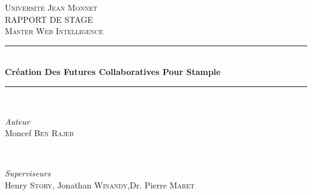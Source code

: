 \documentclass[pdftex,12pt,a4paper]{report}
\begin{document}
\begin{titlepage}

\newcommand{\HRule}{\rule{\linewidth}{0.9mm}} %
\vspace*{2cm}


\center %
 

\textsc{\LARGE Universite Jean Monnet}\\[1.5cm] %
\textsc{\Large RAPPORT DE STAGE}\\[0.5cm] %
\textsc{\large Master Web Intelligence}\\[0.5cm] %


\HRule \\[1.2cm]
{ \huge \bfseries Cr\'eation Des Futures Collaboratives Pour Stample}\\[1.6cm] %
\HRule \\[2cm]
 

\begin{minipage}{0.45\textwidth}
\begin{flushleft} \large
\emph{Auteur}\\
Moncef \textsc{Ben Rajeb} %
\end{flushleft}
\end{minipage}
~
\begin{minipage}{0.45\textwidth}
\begin{flushleft} \large
\emph{Superviseurs} \\
Henry \textsc{Story}, \newline 
Jonathan \textsc{Winandy},\newline Dr. Pierre \textsc{Maret} %


\end{flushleft}
\end{minipage}
\end{titlepage}
\end{document}

